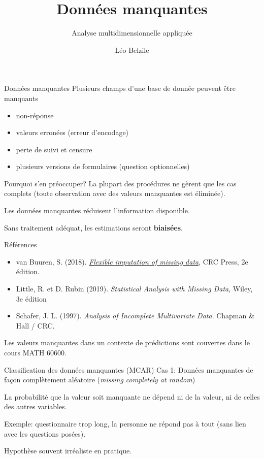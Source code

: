 \documentclass[
  ignorenonframetext,
]{beamer}
\title{Données manquantes}
\subtitle{Analyse multidimensionnelle appliquée}
\author{Léo Belzile}
\date{}
\institute{HEC Montréal}
\providecommand{\tightlist}{%
  \setlength{\itemsep}{0pt}\setlength{\parskip}{0pt}}\usepackage{longtable,booktabs,array}
\begin{document}
\frame{\titlepage}
\ifdefined\Shaded\renewenvironment{Shaded}{\begin{tcolorbox}[interior hidden, borderline west={3pt}{0pt}{shadecolor}, frame hidden, breakable, enhanced, sharp corners, boxrule=0pt]}{\end{tcolorbox}}\fi

\begin{frame}{Données manquantes}
\protect\hypertarget{donnuxe9es-manquantes}{}
Plusieurs champs d'une base de donnée peuvent être manquants

\begin{itemize}
\tightlist
\item
  non-réponse
\item
  valeurs erronées (erreur d'encodage)
\item
  perte de suivi et censure
\item
  plusieurs versions de formulaires (question optionnelles)
\end{itemize}
\end{frame}

\begin{frame}{Pourquoi s'en préoccuper?}
\protect\hypertarget{pourquoi-sen-pruxe9occuper}{}
La plupart des procédures ne gèrent que les cas complets (toute
observation avec des valeurs manquantes est éliminée).

Les données manquantes réduisent l'information disponible.

Sans traitement adéquat, les estimations seront \textbf{biaisées}.
\end{frame}

\begin{frame}{Références}
\protect\hypertarget{ruxe9fuxe9rences}{}
\begin{itemize}
\tightlist
\item
  van Buuren, S. (2018).
  \href{https://stefvanbuuren.name/fimd/}{\emph{Flexible imputation of
  missing data}}, CRC Press, 2e édition.
\item
  Little, R. et D. Rubin (2019). \emph{Statistical Analysis with Missing
  Data}, Wiley, 3e édition
\item
  Schafer, J. L. (1997). \emph{Analysis of Incomplete Multivariate
  Data}. Chapman \& Hall / CRC.
\end{itemize}

Les valeurs manquantes dans un contexte de prédictions sont couvertes
dans le cours MATH 60600.
\end{frame}

\begin{frame}{Classification des données manquantes (MCAR)}
\protect\hypertarget{classification-des-donnuxe9es-manquantes-mcar}{}
Cas 1: Données manquantes de façon complètement aléatoire (\emph{missing
completely at random})

La probabilité que la valeur soit manquante ne dépend ni de la valeur,
ni de celles des autres variables.

Exemple: questionnaire trop long, la personne ne répond pas à tout (sans
lien avec les questions posées).

Hypothèse souvent irréaliste en pratique.
\end{frame}
\end{document}
